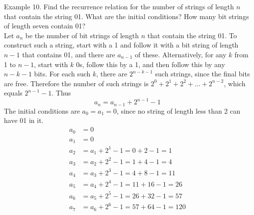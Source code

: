 \documentclass[12pt]{article}
\begin{document}

\begin{example} Example 10. Find the recurrence relation for the number of strings of length $n$ that contain the string 01. What are the initial conditions? How many bit strings of length seven contain 01? \\ 
Let $a_n$ be the number of bit strings of length $n$ that contain the string 01. To construct such a string, start with a 1 and follow it with a bit string of length $n - 1$ that contains 01, and there are $a_{n - 1}$ of these. Alternatively, for any $k$ from 1 to $n - 1$, start with $k$ 0s, follow this by a 1, and then follow this by any $n - k - 1$ bits. For each such $k$, there are $2^{n - k - 1}$ such strings, since the final bits are free. Therefore the number of such strings is $2^0 + 2^1 + 2^2 + \dots + 2^{n - 2}$, which equals $2^{n - 1} - 1$. Thus $$a_n = a_{n - 1} + 2^{n - 1} - 1 $$ 
The initial conditions are $a_0 = a_1 = 0$, since no string of length less than 2 can have 01 in it. 
$$\begin{aligned}
 a_0 &= 0 \\ a_1 &= 0 \\ a_2 &= a_1 + 2^1 - 1 = 0 + 2 - 1 = 1 \\ a_3 &= a_2 + 2^2 - 1 = 1 + 4 - 1 = 4 \\ a_4 &= a_3 + 2^3 - 1 = 4 + 8 - 1 = 11 \\ a_5 &= a_4 + 2^4 - 1 = 11 + 16 - 1 = 26 \\ a_6 &= a_5 + 2^5 - 1 = 26 + 32 - 1 = 57 \\ a_7 &= a_6 + 2^6 - 1 = 57 + 64 - 1 = 120 \end{aligned} $$ \end{example} 
\end{document}
